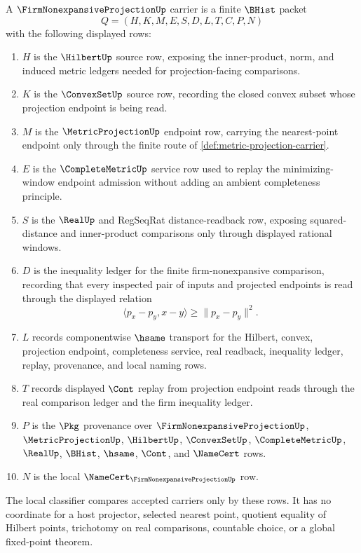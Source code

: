 \begin{definition}\label{def:firm-nonexpansive-projection-carrier}
A $\FirmNonexpansiveProjectionUp$ carrier is a finite $\BHist$ packet
$$
Q=(H,K,M,E,S,D,L,T,C,P,N)
$$
with the following displayed rows:
\begin{enumerate}
\item $H$ is the $\HilbertUp$ source row, exposing the inner-product, norm, and induced metric ledgers needed for projection-facing comparisons.
\item $K$ is the $\ConvexSetUp$ source row, recording the closed convex subset whose projection endpoint is being read.
\item $M$ is the $\MetricProjectionUp$ endpoint row, carrying the nearest-point endpoint only through the finite route of \autoref{def:metric-projection-carrier}.
\item $E$ is the $\CompleteMetricUp$ service row used to replay the minimizing-window endpoint admission without adding an ambient completeness principle.
\item $S$ is the $\RealUp$ and RegSeqRat distance-readback row, exposing squared-distance and inner-product comparisons only through displayed rational windows.
\item $D$ is the inequality ledger for the finite firm-nonexpansive comparison, recording that every inspected pair of inputs and projected endpoints is read through the displayed relation
$$
\langle p_x-p_y,x-y\rangle \geq \lVert p_x-p_y\rVert^2 .
$$
\item $L$ records componentwise $\hsame$ transport for the Hilbert, convex, projection endpoint, completeness service, real readback, inequality ledger, replay, provenance, and local naming rows.
\item $T$ records displayed $\Cont$ replay from projection endpoint reads through the real comparison ledger and the firm inequality ledger.
\item $P$ is the $\Pkg$ provenance over $\FirmNonexpansiveProjectionUp$, $\MetricProjectionUp$, $\HilbertUp$, $\ConvexSetUp$, $\CompleteMetricUp$, $\RealUp$, $\BHist$, $\hsame$, $\Cont$, and $\NameCert$ rows.
\item $N$ is the local $\NameCert_{\FirmNonexpansiveProjectionUp}$ row.
\end{enumerate}
The local classifier compares accepted carriers only by these rows. It has no coordinate for a host projector, selected nearest point, quotient equality of Hilbert points, trichotomy on real comparisons, countable choice, or a global fixed-point theorem.
\end{definition}

